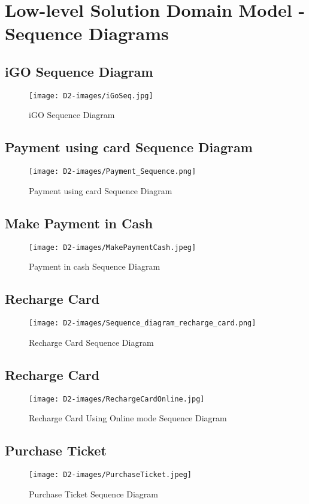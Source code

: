 \documentclass[a4paper,12pt]{report}
\begin{document}
\section{Low-level Solution Domain Model - Sequence Diagrams}
\subsection{iGO Sequence Diagram}
\begin{figure}[h!]
  \centering
   \texttt{[image: D2-images/iGoSeq.jpg]}
  \caption{iGO Sequence Diagram}
\end{figure}
\newpage
\subsection{Payment using card Sequence Diagram}
\begin{figure}[h!]
  \centering
   \texttt{[image: D2-images/Payment\_Sequence.png]}
  \caption{Payment using card Sequence Diagram}
\end{figure}
\newpage
\subsection{Make Payment in Cash}
\begin{figure}[h!]
  \centering
   \texttt{[image: D2-images/MakePaymentCash.jpeg]}
  \caption{Payment in cash Sequence Diagram}
\end{figure}
\newpage
\subsection{Recharge Card}
\begin{figure}[h!]
  \centering
   \texttt{[image: D2-images/Sequence\_diagram\_recharge\_card.png]}
  \caption{Recharge Card Sequence Diagram}
\end{figure}
\newpage
\subsection{Recharge Card}
\begin{figure}[h!]
  \centering
   \texttt{[image: D2-images/RechargeCardOnline.jpg]}
  \caption{Recharge Card Using Online mode Sequence Diagram}
\end{figure}
\newpage
\subsection{Purchase Ticket}
\begin{figure}[h!]
  \centering
   \texttt{[image: D2-images/PurchaseTicket.jpeg]}
  \caption{Purchase Ticket Sequence Diagram}
\end{figure}
\end{document}
